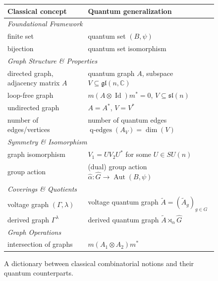 \begin{figure}[htbp]
    \centering
    \footnotesize
    \renewcommand{\arraystretch}{1.15}
    \begin{tabular}{|l|l|}
        \hline
        \textbf{Classical concept} & \textbf{Quantum generalization} \\
        \hline
        \multicolumn{2}{l}{\emph{Foundational Framework}} \\
        \hline
        finite set & quantum set \( (B, \psi) \) \\
        bijection & quantum set isomorphism \\
        \hline
        \multicolumn{2}{l}{\emph{Graph Structure \& Properties}} \\
        \hline
        directed graph, adjacency matrix \( A \) & quantum graph \( A
        \), subspace \( V \subseteq \mathfrak{gl}(n, \mathbb{C}) \) \\
        loop-free graph & \( m(A \otimes \operatorname{Id}) m^* = 0
        \), \( V \subseteq \mathfrak{sl}(n) \) \\
        undirected graph & \( A = A^* \), \( V = V^* \) \\
        number of edges/vertices & number of quantum edges
        \( \operatorname{q\text{-}edges}(A_V) = \dim(V) \) \\
        \hline
        \multicolumn{2}{l}{\emph{Symmetry \& Isomorphism}} \\
        \hline
        graph isomorphism & \( V_1 = UV_2U^* \) for some \( U \in SU(n) \) \\
        group action & (dual) group action \( \widehat\alpha \colon
        \widehat{G} \to \operatorname{Aut}(B,\psi) \) \\
        \hline
        \multicolumn{2}{l}{\emph{Coverings \& Quotients}} \\
        \hline
        voltage graph \( (\Gamma, \lambda) \) & voltage quantum graph
        \( \widetilde{A} = (\widetilde{A}_g)_{g\in G} \) \\
        derived graph \( \Gamma^\lambda \) & derived quantum graph \(
        \widetilde{A} \rtimes_{\widehat\alpha} \widehat{G} \) \\
        \hline
        \multicolumn{2}{l}{\emph{Graph Operations}} \\
        \hline
        intersection of graphs & \( m(A_1 \otimes A_2)m^* \) \\
        \hline
    \end{tabular}
    \caption{A dictionary between classical combinatorial notions and
    their quantum counterparts.}
    \label{fig:classical-quantum-dictionary}
\end{figure}
